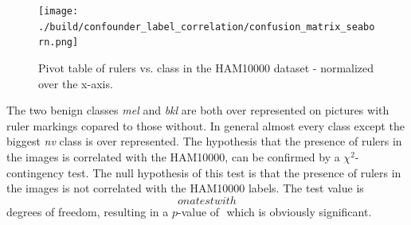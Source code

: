 \begin{figure}[ht]

\centering
\texttt{[image: ./build/confounder\_label\_correlation/confusion\_matrix\_seaborn.png]}
\caption{Pivot table of rulers vs. class in the HAM10000 dataset - normalized over the x-axis.}
\label{fig:ruler_vs_dx}
\end{figure}

The two benign classes \textit{mel} and \textit{bkl} are both over represented on pictures with ruler markings copared to those without.
In general almost every class except the biggest \textit{nv} class is over represented.
The hypothesis that the presence of rulers in the images is correlated with the HAM10000, can be confirmed by a $\chi^2$-contingency test.
The null hypothesis of this test is that the presence of rulers in the images is not correlated with the HAM10000 labels.
The test value is 
    $$
on a test with
    $$
degrees of freedom, resulting in a $p$-value of 
    $$
which is obviously significant.
